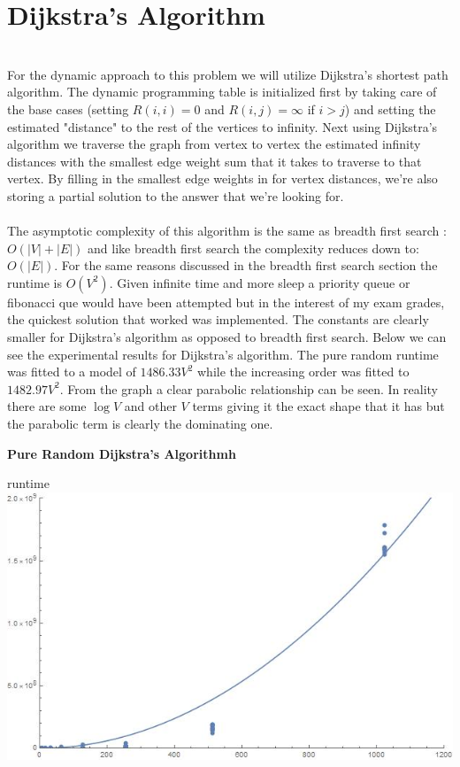 \documentclass[12pt]{report}
\begin{document}
\section*{Dijkstra's Algorithm}
 \ \\
For the dynamic approach to this problem we will utilize Dijkstra's shortest 
path algorithm. The dynamic programming table is initialized first by taking 
care of the base cases (setting $R(i,i)=0$ and $R(i,j)=\infty$ if $i>j$) and 
setting the estimated "distance" to the rest of the vertices to infinity. Next 
using Dijkstra's algorithm we traverse the graph from vertex to vertex
the estimated infinity distances with the smallest edge weight sum that it
takes to traverse to that vertex. By filling in the smallest edge weights in
for vertex distances, we're also storing a partial solution to the answer that
we're looking for.\\\\
The asymptotic complexity of this algorithm is the same as breadth first search
: $O(|V|+|E|)$ and like breadth first search the complexity reduces down to:
 $O(|E|)$. For the same reasons discussed in the breadth first search section
 the runtime is $O(V^2)$. Given infinite time and more sleep a priority queue or
 fibonacci que would have been attempted but in the interest of my exam grades,
 the quickest solution that worked was implemented. The constants are clearly 
 smaller for Dijkstra's algorithm as opposed to breadth first search. Below 
 we can see the experimental results for Dijkstra's algorithm. The pure random runtime was
fitted to a model of $1486.33  V^2$ while the increasing order was 
fitted to $1482.97V^2$. From the graph a clear parabolic relationship
can be seen. In reality there are some $\log{V}$ and other $V$ terms giving
it the exact shape that it has but the parabolic term is clearly the dominating
one.
 \newpage
 \centerline{\textbf{Pure Random Dijkstra's Algorithmh}}
 runtime \includegraphics[scale=.5]{puredij.jpg}\\
\end{document}
